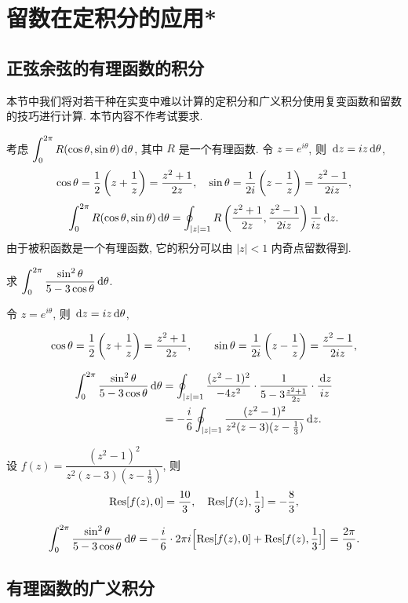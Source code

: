 \section{留数在定积分的应用*}

\subsection{正弦余弦的有理函数的积分}

本节中我们将对若干种在实变中难以计算的定积分和广义积分使用复变函数和留数的技巧进行计算.
本节内容不作考试要求.

考虑 $\displaystyle\int_0^{2\pi} R(\cos\theta,\sin\theta)\,\mathrm{d}\theta$, 其中 $R$ 是一个有理函数.
令 $z=e^{i\theta}$, 则 $\,\mathrm{d} z=iz\,\mathrm{d}\theta$,
\[\cos\theta=\frac{1}{2}\left(z+\frac1z\right)=\frac{z^2+1}{2z},\quad
\sin\theta=\frac1{2i}\left(z-\frac1z\right)=\frac{z^2-1}{2iz},\]
	\[\int_0^{2\pi} R(\cos\theta,\sin\theta)\,\mathrm{d}\theta
	=\oint_{|z|=1} R\left(\frac{z^2+1}{2z},\frac{z^2-1}{2iz}\right)\frac1{iz}\,\mathrm{d} z.\]
由于被积函数是一个有理函数, 它的积分可以由 $|z|<1$ 内奇点留数得到.

\begin{example}
	求 $\displaystyle\int_0^{2\pi}\frac{\sin^2\theta}{5-3\cos\theta}\,\mathrm{d}\theta$.
\end{example}

\begin{solution}
	令 $z=e^{i\theta}$, 则 $\,\mathrm{d} z=iz\,\mathrm{d}\theta$,
	{
		\[\cos\theta=\frac{1}{2}\left(z+\frac1z\right)=\frac{z^2+1}{2z},\qquad
		\sin\theta=\frac1{2i}\left(z-\frac1z\right)=\frac{z^2-1}{2iz},\]

		\begin{align*}
			\int_0^{2\pi}\frac{\sin^2\theta}{5-3\cos\theta}\,\mathrm{d}\theta
			&=\oint_{|z|=1}\frac{(z^2-1)^2}{-4z^2}\cdot\frac1{5-3\frac{z^2+1}{2z}}\cdot\frac{\,\mathrm{d} z}{iz}\\
			&=-\frac i6\oint_{|z|=1}\frac{(z^2-1)^2}{z^2(z-3)(z-\frac13)}\,\mathrm{d} z.
		\end{align*}
	}
	设 $f(z)=\dfrac{(z^2-1)^2}{z^2(z-3)(z-\frac13)}$,
	{则
		\[{\mathrm{Res}}[f(z),0]=\frac{10}3,\quad{\mathrm{Res}}[f(z),\frac13]=-\frac83,\]
	}

	{
		\[
			\int_0^{2\pi}\frac{\sin^2\theta}{5-3\cos\theta}\,\mathrm{d}\theta
			=-\frac i6\cdot 2\pi i\Bigl[{\mathrm{Res}}[f(z),0]+{\mathrm{Res}}[f(z),\frac13]\Bigr]
			=\frac{2\pi}9.
		\]
	}
\end{solution}

\subsection{有理函数的广义积分}

